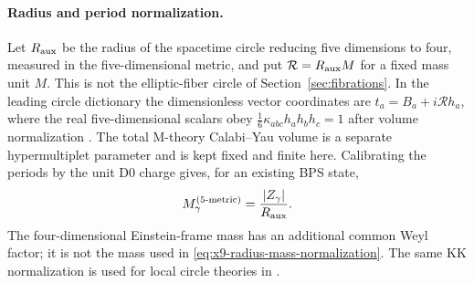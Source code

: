 \paragraph{Radius and period normalization.}
Let $R_{\rm aux}$ be the radius of the spacetime circle reducing five
dimensions to four, measured in the five-dimensional metric, and put
$\mathcal R=R_{\rm aux}M$ for a fixed mass unit $M$.
This is not the elliptic-fiber circle of Section~\ref{sec:fibrations}.
In the leading circle dictionary the dimensionless vector coordinates
are $t_a=B_a+i\mathcal R h_a$, where the real five-dimensional scalars
obey $\frac16\kappa_{abc}h_ah_bh_c=1$ after volume normalization
\cite[eqs.~(5.35)--(5.41)]{Hattab:2025M2}.
The total M-theory Calabi--Yau volume is a separate hypermultiplet
parameter and is kept fixed and finite here. Calibrating the periods
by the unit D0 charge gives, for an existing BPS state,
\begin{equation}
 M_\gamma^{(5\text{-metric})}
       =\frac{|Z_\gamma|}{R_{\rm aux}}.
 \label{eq:x9-radius-mass-normalization}
\end{equation}
The four-dimensional Einstein-frame mass has an additional common Weyl
factor; it is not the mass used in \eqref{eq:x9-radius-mass-normalization}.
The same KK normalization is used for local circle theories in
\cite[eq.~(2.27)]{Closset:2022UPlane}.

